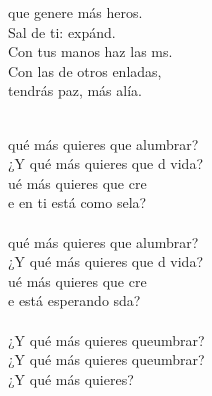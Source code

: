 \begin{cancion}
	que genere más heros.\\
	Sal de ti: expánd. \\
	Con tus manos haz las ms.\\
	Con las de otros enladas,\\
	tendrás paz, más alía.\\\jump\\
	\begin{chorus}%
	 qué más quieres que alumbrar?\\
	¿Y qué más quieres que d vida?\\
	ué más quieres que cre \\
	e en ti está como sela?\\
\jump\\
	 qué más quieres que alumbrar?\\
	¿Y qué más quieres que d vida?\\
	ué más quieres que cre \\
	e está esperando sda?\\
\jump\\
	¿Y qué más quieres queumbrar?\\
	¿Y qué más quieres queumbrar?\\
¿Y qué más quieres?\\
	\end{chorus}%
	\jump\\
\end{cancion}%
